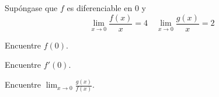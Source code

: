 \item Supóngase que $f$ es diferenciable en $0$ y
$$\lim_{x \to 0} \frac{f(x)}{x} = 4 \quad \lim_{x \to 0} \frac{g(x)}{x} = 2$$
\begin{enumerate}
    \begin{minipage}{0.3\textwidth}
    \item[(a)] Encuentre $f(0)$.
    \end{minipage}
    \begin{minipage}{0.3\textwidth}
    \item[(b)] Encuentre $f'(0)$.
    \end{minipage}
    \begin{minipage}{0.3\textwidth}
    \item[(c)] Encuentre $\displaystyle \lim_{x \to 0} \frac{g(x)}{f(x)}$.
    \end{minipage}
\end{enumerate}
